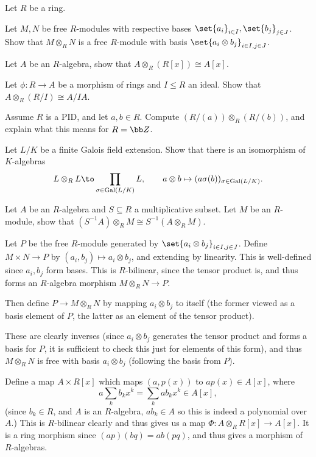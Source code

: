     Let $R$ be a ring.
    \benum
        \item Let $M,N$ be free $R$-modules with respective bases $\set{a_i}_{i\in I},\set{b_j}_{j\in J}$.
        Show that $M\otimes_RN$ is a free $R$-module with basis $\set{a_i\otimes b_j}_{i\in I,j\in J}$.
        \item Let $A$ be an $R$-algebra, show that $A\otimes_R(R[x])\cong A[x]$.
        \item Let $\phi\colon R\to A$ be a morphism of rings and $I\leq R$ an ideal.
        Show that $A\otimes_R(R/I)\cong A/IA$.
        \item Assume $R$ is a PID, and let $a,b\in R$.
        Compute $(R/(a))\otimes_R(R/(b))$, and explain what this means for $R=\bZ$.
        \item Let $L/K$ be a finite Galois field extension.
        Show that there is an isomorphism of $K$-algebras
        $$ L\otimes_RL \to \prod_{\sigma\in\Gal(L/K)}L,\qquad a\otimes b\mapsto(a\sigma(b))_{\sigma\in\Gal(L/K)} . $$
        \item Let $A$ be an $R$-algebra and $S\subseteq R$ a multiplicative subset.
        Let $M$ be an $R$-module, show that $(S^{-1}A)\otimes_RM\cong S^{-1}(A\otimes_RM)$.
    \eenum

\eprob

\benum
    \item Let $P$ be the free $R$-module generated by $\set{a_i\otimes b_j}_{i\in I,j\in J}$.
    Define $M\times N\to P$ by $(a_i,b_j)\mapsto a_i\otimes b_j$, and extending by linearity.
    This is well-defined since $a_i,b_j$ form bases.
    This is $R$-bilinear, since the tensor product is, and thus forms an $R$-algebra morphism $M\otimes_RN\to P$.

    Then define $P\to M\otimes_RN$ by mapping $a_i\otimes b_j$ to itself (the former viewed as a basis element of $P$, the latter as an
    element of the tensor product).

    These are clearly inverses (since $a_i\otimes b_j$ generates the tensor product and forms a basis for $P$, it is sufficient to check
    this just for elements of this form), and thus $M\otimes_RN$ is free with basis $a_i\otimes b_j$ (following the basis from $P$).

    \item Define a map $A\times R[x]$ which maps $(a,p(x))$ to $ap(x)\in A[x]$, where
    $$ a\sum_kb_kx^k = \sum_k ab_kx^k \in A[x] , $$
    (since $b_k\in R$, and $A$ is an $R$-algebra, $ab_k\in A$ so this is indeed a polynomial over $A$.)
    This is $R$-bilinear clearly and thus gives us a map $\Phi\colon A\otimes_RR[x]\to A[x]$.
    It is a ring morphism since $(ap)(bq)=ab(pq)$, and thus gives a morphism of $R$-algebras.

